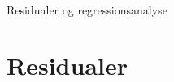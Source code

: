 \documentclass[12pt]{article}
\begin{document}




\begin{center}
	\Huge
	Residualer og regressionsanalyse
\end{center}

\section*{Residualer}
\end{document}
